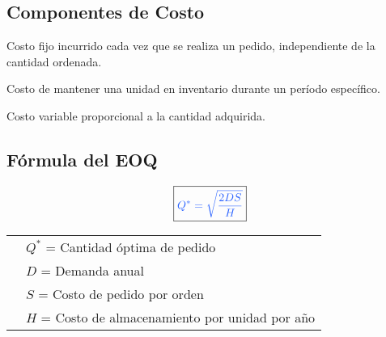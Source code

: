 \documentclass[12pt,a4paper]{book}
\begin{document}
	\subsection{Componentes de Costo}
	
	\begin{multicols}{3}
		\begin{tcolorbox}[colback=verdeclaro,colframe=verdeprincipal,boxrule=2pt,arc=8pt,center title,
			title={\bfseries\color{white} \faShoppingCart\ PEDIDO}]
			\centering
			Costo fijo incurrido cada vez que se realiza un pedido, independiente de la cantidad ordenada.
		\end{tcolorbox}
		
		\begin{tcolorbox}[colback=azulclaro,colframe=azulprincipal,boxrule=2pt,arc=8pt,center title,
			title={\bfseries\color{white} \faWarehouse\ ALMACENAMIENTO}]
			\centering
			Costo de mantener una unidad en inventario durante un período específico.
		\end{tcolorbox}
		
		\begin{tcolorbox}[colback=naranjaclaro,colframe=naranjaacento,boxrule=2pt,arc=8pt,center title,
			title={\bfseries\color{white} \faCoins\ ADQUISICIÓN}]
			\centering
			Costo variable proporcional a la cantidad adquirida.
		\end{tcolorbox}
	\end{multicols}
	
	\subsection{Fórmula del EOQ}
	
	\begin{tcolorbox}[enhanced,colback=white,colframe=azulprincipal,boxrule=3pt,arc=10pt,
		drop shadow,title={\Large\bfseries\color{white} \faCalculator\ CANTIDAD ECONÓMICA DE PEDIDO}]
		
		\begin{equation}
			\boxed{\color{azulprincipal} Q^* = \sqrt{\frac{2DS}{H}}}
		\end{equation}
		
		\begin{center}
			\begin{tabular}{cl}
				\textcolor{azulprincipal}{\faArrowRight} & $Q^*$ = Cantidad óptima de pedido \\
				\textcolor{verdeprincipal}{\faArrowRight} & $D$ = Demanda anual \\
				\textcolor{rojoacento}{\faArrowRight} & $S$ = Costo de pedido por orden \\
				\textcolor{moradoacento}{\faArrowRight} & $H$ = Costo de almacenamiento por unidad por año \\
			\end{tabular}
		\end{center}
		
	\end{tcolorbox}
	
\end{document}
